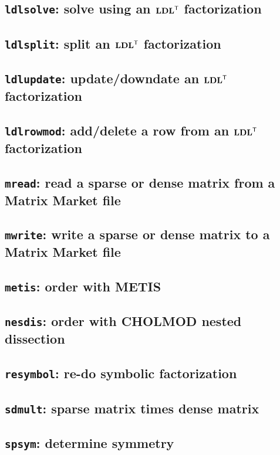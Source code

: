 \documentclass[11pt]{article}
\newcommand{\m}[1]{{\bf{#1}}}       %
\newcommand{\tr}{^{\sf T}}          %
\begin{document}
\subsection{{\tt ldlsolve}: solve using an $\m{LDL}\tr$ factorization}		
\subsection{{\tt ldlsplit}: split an $\m{LDL}\tr$ factorization}		
\newpage
\subsection{{\tt ldlupdate}: update/downdate an $\m{LDL}\tr$ factorization}	
\newpage
\subsection{{\tt ldlrowmod}: add/delete a row from an $\m{LDL}\tr$ factorization}	
\newpage
\subsection{{\tt mread}: read a sparse or dense matrix from a Matrix Market file}
\subsection{{\tt mwrite}: write a sparse or dense matrix to a Matrix Market file}	
\newpage
\subsection{{\tt metis}: order with METIS}					
\newpage
\subsection{{\tt nesdis}: order with CHOLMOD nested dissection}			
\newpage
\subsection{{\tt resymbol}: re-do symbolic factorization}			
\subsection{{\tt sdmult}: sparse matrix times dense matrix}			
\newpage
\subsection{{\tt spsym}: determine symmetry}				
\newpage
\end{document}
